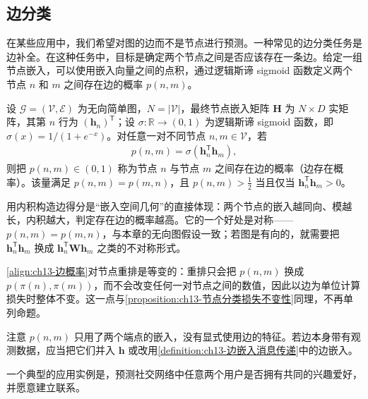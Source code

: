 \documentclass[../../main.tex]{subfiles}
\begin{document}
\subsection{边分类}\label{subsection:ch13-边分类}

在某些应用中，我们希望对图的边而不是节点进行预测。一种常见的边分类任务是边补全。在这种任务中，目标是确定两个节点之间是否应该存在一条边。给定一组节点嵌入，可以使用嵌入向量之间的点积，通过逻辑斯谛 sigmoid 函数定义两个节点 $n$ 和 $m$ 之间存在边的概率 $p(n,m)$。

\begin{definition}[边存在概率]\label{definition:ch13-边存在概率}
设 $\mathcal{G}=(\mathcal{V},\mathcal{E})$ 为无向简单图，$N=|\mathcal{V}|$，最终节点嵌入矩阵 $\bm{H}$ 为 $N\times D$ 实矩阵，其第 $n$ 行为 $(\bm{h}_n)^{\mathsf T}$；设 $\sigma:\mathbb{R}\to(0,1)$ 为逻辑斯谛 sigmoid 函数，即 $\sigma(x)=1/(1+e^{-x})$。对任意一对不同节点 $n,m\in\mathcal{V}$，若
\begin{align}
p(n,m)=\sigma\!\left(\bm{h}_n^{\mathsf T}\bm{h}_m\right),
\label{align:ch13-边概率}
\end{align}
则把 $p(n,m)\in(0,1)$ 称为节点 $n$ 与节点 $m$ 之间存在边的概率（边存在概率）。该量满足 $p(n,m)=p(m,n)$，且 $p(n,m)>\tfrac12$ 当且仅当 $\bm{h}_n^{\mathsf T}\bm{h}_m>0$。
\end{definition}

\begin{remark}
用内积构造边得分是“嵌入空间几何”的直接体现：两个节点的嵌入越同向、模越长，内积越大，判定存在边的概率越高。它的一个好处是对称——$p(n,m)=p(m,n)$，与本章的无向图假设一致；若图是有向的，就需要把 $\bm{h}_n^{\mathsf T}\bm{h}_m$ 换成 $\bm{h}_n^{\mathsf T}\bm{W}\bm{h}_m$ 之类的不对称形式。\par
\eqref{align:ch13-边概率}对节点重排是等变的：重排只会把 $p(n,m)$ 换成 $p(\pi(n),\pi(m))$，而不会改变任何一对节点之间的数值，因此以边为单位计算损失时整体不变。这一点与\cref{proposition:ch13-节点分类损失不变性}同理，不再单列命题。\par
注意 $p(n,m)$ 只用了两个端点的嵌入，没有显式使用边的特征。若边本身带有观测数据，应当把它们并入 $\bm{h}$ 或改用\cref{definition:ch13-边嵌入消息传递}中的边嵌入。
\end{remark}

\begin{example}[ 社交网络中的边预测]\label{example:ch13-社交网络边预测}
一个典型的应用实例是，预测社交网络中任意两个用户是否拥有共同的兴趣爱好，并愿意建立联系。
\end{example}
\end{document}
